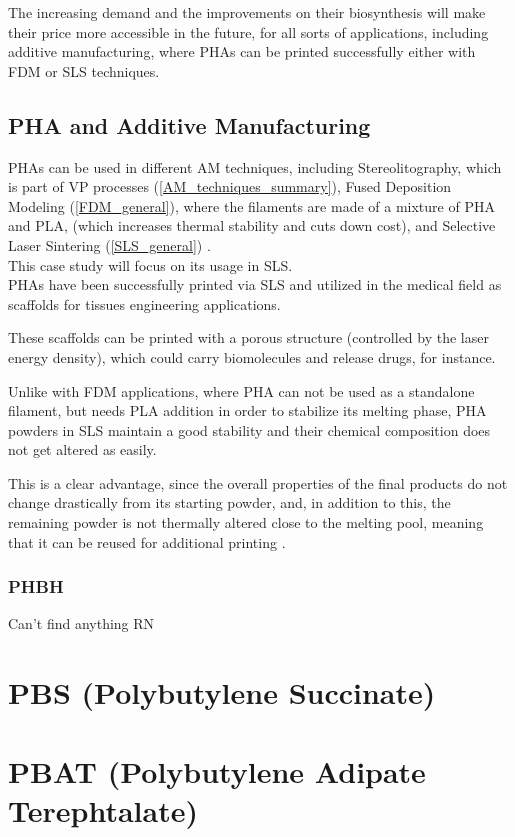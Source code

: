 \documentclass{article}
\begin{document}
    The increasing demand and the improvements on their biosynthesis will make their price more accessible in the future, for all sorts of 
    applications, including additive manufacturing, where PHAs can be printed successfully either with FDM or SLS techniques. \clearpage

    
    \subsection{PHA and Additive Manufacturing \label{PHA_in_Additive}}

    PHAs can be used in different AM techniques, including Stereolitography, which is part of VP processes (\ref{AM_techniques_summary}), 
    Fused Deposition Modeling (\ref{FDM_general}), where the filaments are made of a mixture of PHA and PLA, 
    (which increases thermal stability and cuts down cost), and 
    Selective Laser Sintering (\ref{SLS_general}) \autocite{Kovalcik_PHA_Review}. \\ 

    This case study will focus on its usage in SLS. \\ 

    PHAs have been successfully printed via SLS and utilized in the medical field as scaffolds for tissues engineering applications. 

    These scaffolds can be printed with a porous structure (controlled by the laser energy density), 
    which could carry biomolecules and release drugs, for instance.
    
    Unlike with FDM applications, where PHA can not be used as a standalone filament, but needs PLA addition in order to stabilize its melting 
    phase, PHA powders in SLS maintain a good stability and their chemical composition does not get altered as easily. 

    This is a clear advantage, since the overall properties of the final products do not change drastically from its starting powder, 
    and, in addition to this, the remaining powder is not thermally altered close to the melting pool, meaning that it can 
    be reused for additional printing \autocite{Kovalcik_PHA_Review}.  \\
        
    \subsubsection{PHBH \label{PHBH}}

    Can't find anything RN \clearpage

    \section{PBS (Polybutylene Succinate) \label{PBS_in_general}}

    \section{PBAT (Polybutylene Adipate Terephtalate) \label{PBAT_in_general}}










    \clearpage

    \printbibliography
    
\end{document}
